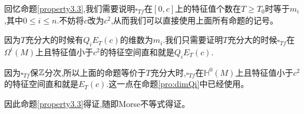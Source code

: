 回忆命题\ref{property3.3},我们需要说明$\square_{Tf}$在$[0,c]$上的特征值个数在$T\geq T_0$时等于$m_i$,其中$0\leq i \leq n$.不妨将$c$改为$c^2$,从而我们可以直接使用上面所有命题的记号。

因为$T$充分大的时候有$Q_iE_T(c)$的维数为$m_i$.我们只需要证明$T$充分大的时候$\square_{Tf}$在$\Omega^i(M)$上且特征值小于$c^2$的特征空间直和就是$Q_iE_T(c)$.

因为$\square_{Tf}$保$\mathbb{Z}$分次,所以上面的命题等价于$T$充分大时,$\square_{Tf}$在$\mathbb{H}^0(M)$上且特征值小于$c^2$的特征空间直和就是$E_T(c)$.这一点在命题\ref{pro:dimQi}中已经使用。

因此命题\ref{property3.3}得证,随即Morse不等式得证。
\ifx\allfiles\undefined
	
	
	
	
	\else
	\fi